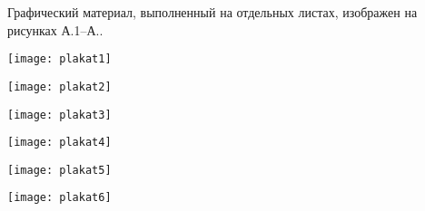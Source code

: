 
Графический материал, выполненный на отдельных листах,
изображен на рисунках А.1--А..
\setcounter{числоПлакатов}{0}

\renewcommand{\thefigure}{А.\arabic{figure}} %

\begin{landscape}

\begin{плакат}
	\texttt{[image: plakat1]}
	\label{plakat1:image}      
\end{плакат}

\begin{плакат}
	\texttt{[image: plakat2]}
	\label{plakat2:image}      
\end{плакат}

\begin{плакат}
	\texttt{[image: plakat3]}
	\label{plakat3:image}      
\end{плакат}

\begin{плакат}
	\texttt{[image: plakat4]}
	\label{plakat4:image}      
\end{плакат}

\begin{плакат}
	\texttt{[image: plakat5]}
	\label{plakat5:image}      
\end{плакат}

\begin{плакат}
	\texttt{[image: plakat6]}
	\label{plakat6:image}      
\end{плакат}

\end{landscape}
